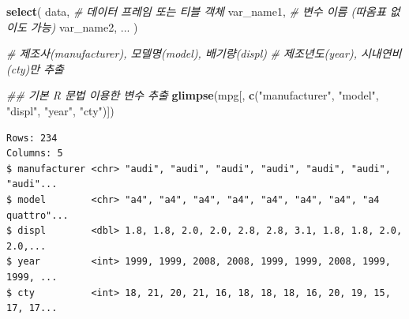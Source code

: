 \documentclass[
  11pt,
]{krantz}
\newenvironment{Shaded}{\begin{snugshade}}{\end{snugshade}}
\newcommand{\CommentTok}[1]{\textcolor[rgb]{0.37,0.37,0.37}{\textit{#1}}}
\newcommand{\KeywordTok}[1]{\textcolor[rgb]{0.27,0.27,0.27}{\textbf{#1}}}
\newcommand{\NormalTok}[1]{#1}
\newcommand{\OperatorTok}[1]{\textcolor[rgb]{0.43,0.43,0.43}{\textbf{#1}}}
\newcommand{\StringTok}[1]{\textcolor[rgb]{0.5,0.5,0.5}{#1}}
\begin{document}
\normalsize

\footnotesize

\begin{Shaded}
\begin{Highlighting}[]
\KeywordTok{select}\NormalTok{(}
\NormalTok{  data, }\CommentTok{# 데이터 프레임 또는 티블 객체}
\NormalTok{  var_name1, }\CommentTok{# 변수 이름 (따옴표 없이도 가능)}
\NormalTok{  var_name2, }
\NormalTok{  ...}
\NormalTok{)}
\end{Highlighting}
\end{Shaded}

\normalsize

\footnotesize

\begin{Shaded}
\begin{Highlighting}[]
\CommentTok{# 제조사(manufacturer), 모델명(model), 배기량(displ)}
\CommentTok{# 제조년도(year), 시내연비 (cty)만 추출}

\CommentTok{## 기본 R 문법 이용한 변수 추출}
\KeywordTok{glimpse}\NormalTok{(mpg[, }\KeywordTok{c}\NormalTok{(}\StringTok{"manufacturer"}\NormalTok{, }\StringTok{"model"}\NormalTok{, }\StringTok{"displ"}\NormalTok{, }\StringTok{"year"}\NormalTok{, }\StringTok{"cty"}\NormalTok{)])}
\end{Highlighting}
\end{Shaded}

\begin{verbatim}
Rows: 234
Columns: 5
$ manufacturer <chr> "audi", "audi", "audi", "audi", "audi", "audi", "audi"...
$ model        <chr> "a4", "a4", "a4", "a4", "a4", "a4", "a4", "a4 quattro"...
$ displ        <dbl> 1.8, 1.8, 2.0, 2.0, 2.8, 2.8, 3.1, 1.8, 1.8, 2.0, 2.0,...
$ year         <int> 1999, 1999, 2008, 2008, 1999, 1999, 2008, 1999, 1999, ...
$ cty          <int> 18, 21, 20, 21, 16, 18, 18, 18, 16, 20, 19, 15, 17, 17...
\end{verbatim}

\begin{Shaded}
\end{Shaded}
\end{document}
